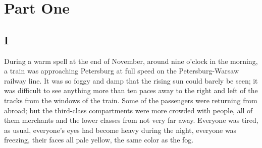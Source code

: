 \part*{Part One}

\chapter*{I}

During a warm spell at the end of November, around nine o'clock in the morning, a train was approaching Petersburg at full speed on the Petersburg-Warsaw railway line. It was so foggy and damp that the rising sun could barely be seen; it was difficult to see anything more than ten paces away to the right and left of the tracks from the windows of the train. Some of the passengers were returning from abroad; but the third-class compartments were more crowded with people, all of them merchants and the lower classes from not very far away. Everyone was tired, as usual, everyone's eyes had become heavy during the night, everyone was freezing, their faces all pale yellow, the same color as the fog.

